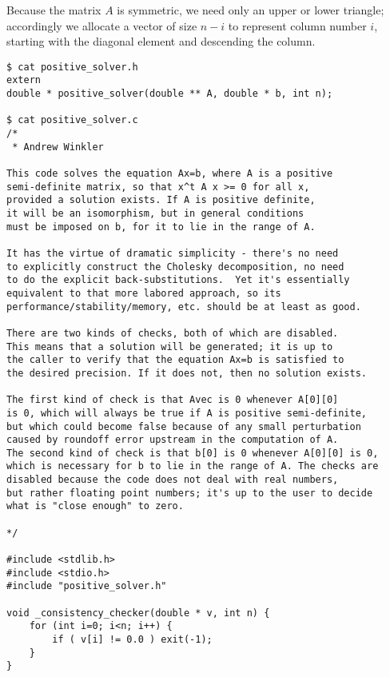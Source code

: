 \documentclass{article}
\begin{document}
Because the matrix \begin{math}A\end{math} is symmetric, we need only an upper or lower triangle; accordingly we allocate a vector of size \begin{math}n-i\end{math} to represent column number \begin{math}i\end{math}, starting with the diagonal element and descending the column.

\begin{verbatim}
$ cat positive_solver.h 
extern
double * positive_solver(double ** A, double * b, int n);

$ cat positive_solver.c
/* 
 * Andrew Winkler

This code solves the equation Ax=b, where A is a positive
semi-definite matrix, so that x^t A x >= 0 for all x,
provided a solution exists. If A is positive definite,
it will be an isomorphism, but in general conditions
must be imposed on b, for it to lie in the range of A.

It has the virtue of dramatic simplicity - there's no need
to explicitly construct the Cholesky decomposition, no need
to do the explicit back-substitutions.  Yet it's essentially
equivalent to that more labored approach, so its
performance/stability/memory, etc. should be at least as good.

There are two kinds of checks, both of which are disabled.
This means that a solution will be generated; it is up to
the caller to verify that the equation Ax=b is satisfied to
the desired precision. If it does not, then no solution exists.

The first kind of check is that Avec is 0 whenever A[0][0]
is 0, which will always be true if A is positive semi-definite,
but which could become false because of any small perturbation
caused by roundoff error upstream in the computation of A.
The second kind of check is that b[0] is 0 whenever A[0][0] is 0,
which is necessary for b to lie in the range of A. The checks are
disabled because the code does not deal with real numbers,
but rather floating point numbers; it's up to the user to decide
what is "close enough" to zero.

*/

#include <stdlib.h>
#include <stdio.h>
#include "positive_solver.h"

void _consistency_checker(double * v, int n) {
    for (int i=0; i<n; i++) {
        if ( v[i] != 0.0 ) exit(-1);
    }
}


\end{verbatim}
\end{document}

